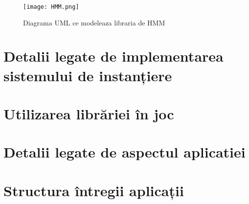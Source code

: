 \vspace{10mm}
\begin{figure}[H]
\centering
\texttt{[image: HMM.png]} \par
\caption{Diagrama UML ce modeleaza libraria de HMM}
\end{figure}

\section{Detalii legate de implementarea sistemului de instanțiere}

\section{Utilizarea librăriei în joc}

\section{Detalii legate de aspectul aplicatiei}

\section{Structura întregii aplicații}